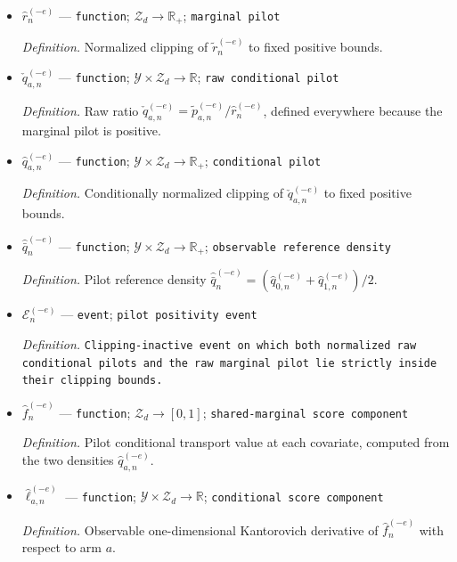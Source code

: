 \documentclass{article}
\begin{document}
\begin{itemize}
  \par\smallskip\noindent\emph{Definition.} \texttt{Average of the two armwise covariate-\allowbreak{}marginal wavelet projections from the opposite folds.}
  \item \(\widehat r_n^{(-e)}\) --- \texttt{function}; \(\mathcal Z_d\to\mathbb R_+\); \texttt{marginal pilot}
  \par\smallskip\noindent\emph{Definition.} Normalized clipping of \(\widetilde r_n^{(-e)}\) to fixed positive bounds.
  \item \(\check q_{a,n}^{(-e)}\) --- \texttt{function}; \(\mathcal Y\times\mathcal Z_d\to\mathbb R\); \texttt{raw conditional pilot}
  \par\smallskip\noindent\emph{Definition.} Raw ratio \(\check q_{a,n}^{(-e)}=\widetilde p_{a,n}^{(-e)}/\widehat r_n^{(-e)}\), defined everywhere because the marginal pilot is positive.
  \item \(\widehat q_{a,n}^{(-e)}\) --- \texttt{function}; \(\mathcal Y\times\mathcal Z_d\to\mathbb R_+\); \texttt{conditional pilot}
  \par\smallskip\noindent\emph{Definition.} Conditionally normalized clipping of \(\check q_{a,n}^{(-e)}\) to fixed positive bounds.
  \item \(\widehat{\bar q}_n^{(-e)}\) --- \texttt{function}; \(\mathcal Y\times\mathcal Z_d\to\mathbb R_+\); \texttt{observable reference density}
  \par\smallskip\noindent\emph{Definition.} Pilot reference density \(\widehat{\bar q}_n^{(-e)}=(\widehat q_{0,n}^{(-e)}+\widehat q_{1,n}^{(-e)})/2\).
  \item \(\mathcal E_n^{(-e)}\) --- \texttt{event}; \texttt{pilot positivity event}
  \par\smallskip\noindent\emph{Definition.} \texttt{Clipping-\allowbreak{}inactive event on which both normalized raw conditional pilots and the raw marginal pilot lie strictly inside their clipping bounds.}
  \item \(\widehat f_n^{(-e)}\) --- \texttt{function}; \(\mathcal Z_d\to[0,1]\); \texttt{shared-\allowbreak{}marginal score component}
  \par\smallskip\noindent\emph{Definition.} Pilot conditional transport value at each covariate, computed from the two densities \(\widehat q_{a,n}^{(-e)}\).
  \item \(\widehat\ell_{a,n}^{(-e)}\) --- \texttt{function}; \(\mathcal Y\times\mathcal Z_d\to\mathbb R\); \texttt{conditional score component}
  \par\smallskip\noindent\emph{Definition.} Observable one-dimensional Kantorovich derivative of \(\widehat f_n^{(-e)}\) with respect to arm \(a\).

\end{itemize}
\end{document}
